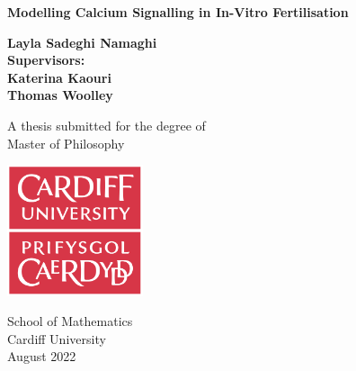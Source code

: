 \begin{titlepage}
    \begin{center}
        \vspace*{1cm}
            
        \huge
        \textbf{Modelling Calcium Signalling in In-Vitro Fertilisation}
            
        \vspace{0.5cm}
        \LARGE
            
        \vspace{1cm}
            
        \textbf{Layla Sadeghi Namaghi}\\
        \vspace{0.5cm}
        \large
        \textbf{Supervisors:\\ Katerina Kaouri\\
        Thomas Woolley}
        
        \vspace{1cm}    
        A thesis submitted
        for the degree of\\
        Master of Philosophy
            
        \vspace{0.8cm}
            
        \includegraphics[width=0.3\textwidth]{cardifflogo.png}
        \vspace{0.8cm}    
            
        \Large
        School of Mathematics\\
        
        Cardiff University\\
        August 2022
            
    \end{center}
\end{titlepage}